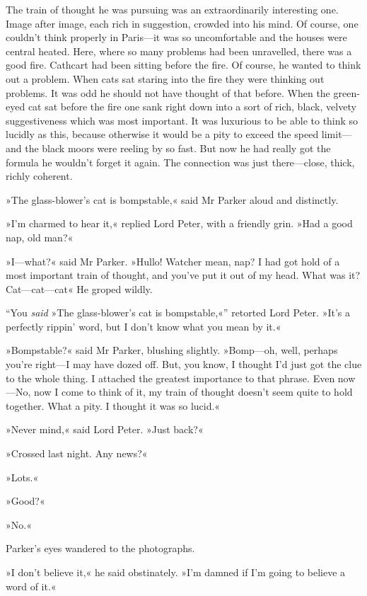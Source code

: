 The train of thought he was pursuing was an extraordinarily interesting one. Image after image, each rich in suggestion, crowded into his mind. Of course, one couldn't think properly in Paris—it was so uncomfortable and the houses were central heated. Here, where so many problems had been unravelled, there was a good fire. Cathcart had been sitting before the fire. Of course, he wanted to think out a problem.  When cats sat staring into the fire they were thinking out problems. It was odd he should not have thought of that before. When the green-eyed cat sat before the fire one sank right down into a sort of rich, black, velvety suggestiveness which was most important. It was luxurious to be able to think so lucidly as this, because otherwise it would be a pity to exceed the speed limit—and the black moors were reeling by so fast.  But now he had really got the formula he wouldn't forget it again. The connection was just there—close, thick, richly coherent.

»The glass-blower's cat is bompstable,« said Mr Parker aloud and distinctly.

»I'm charmed to hear it,« replied Lord Peter, with a friendly grin.  »Had a good nap, old man?«

»I—what?« said Mr Parker. »Hullo! Watcher mean, nap? I had got hold of a most important train of thought, and you've put it out of my head.  What was it? Cat—cat—cat\longdash« He groped wildly.

\enquote{You \textit{said} »The glass-blower's cat is bompstable,«} retorted Lord Peter. »It's a perfectly rippin' word, but I don't know what you mean by it.«

»Bompstable?« said Mr Parker, blushing slightly. »Bomp—oh, well, perhaps you're right—I may have dozed off. But, you know, I thought I'd just got the clue to the whole thing. I attached the greatest importance to that phrase. Even now—No, now I come to think of it, my train of thought doesn't seem quite to hold together. What a pity. I thought it was so lucid.«

»Never mind,« said Lord Peter. »Just back?«

»Crossed last night. Any news?«

»Lots.«

»Good?«

»No.«

Parker's eyes wandered to the photographs.

»I don't believe it,« he said obstinately. »I'm damned if I'm going to believe a word of it.«

